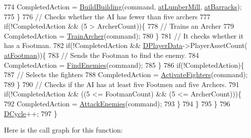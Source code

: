 \begin{DoxyCode}
774                 CompletedAction = \hyperlink{classCAIPlayer_a2ff5263cbaa6bfc62ffec4dbce87ba88}{BuildBuilding}(command, 
      \hyperlink{GameDataTypes_8h_a5600d4fc433b83300308921974477feca7bb38316bc3193b5c9ec67ea6aad549c}{atLumberMill}, \hyperlink{GameDataTypes_8h_a5600d4fc433b83300308921974477feca1cbf6c944f30d615a247eef1f57b2230}{atBarracks});
775             \}
776             \textcolor{comment}{// Checks whether the AI has fewer than five archers}
777             \textcolor{keywordflow}{if}(!CompletedAction &&  (5 > ArcherCount))\{
778                 \textcolor{comment}{// Trains an Archer}
779                 CompletedAction = \hyperlink{classCAIPlayer_af2edf1e3c54d6af693f768f86d484fd6}{TrainArcher}(command);
780             \}
781             \textcolor{comment}{// It checks whether it has a Footman.}
782             \textcolor{keywordflow}{if}(!CompletedAction && \hyperlink{classCAIPlayer_a83b5113c8f7e80df54940b647c5ee2e6}{DPlayerData}->PlayerAssetCount(
      \hyperlink{GameDataTypes_8h_a5600d4fc433b83300308921974477fecad586e8ff9ee846d22630c2066e8fb7c2}{atFootman}))\{
783                 \textcolor{comment}{// Sends the Footman to find the enemy.}
784                 CompletedAction = \hyperlink{classCAIPlayer_a33b1533570e7a00114d1b85b3551e395}{FindEnemies}(command);
785             \}
786             \textcolor{keywordflow}{if}(!CompletedAction)\{
787                 \textcolor{comment}{// Selects the fighters}
788                 CompletedAction = \hyperlink{classCAIPlayer_a4216d7e76315234a4fe22fb3a0a89c1d}{ActivateFighters}(command);
789             \}
790             \textcolor{comment}{// Checks if the AI has at least five Footmen and five Archers.}
791             \textcolor{keywordflow}{if}(!CompletedAction && ((5 <= FootmanCount) && (5 <= ArcherCount)))\{
792                 CompletedAction = \hyperlink{classCAIPlayer_adf7feeba7debf9f19b000887616d7bfb}{AttackEnemies}(command);
793             \}
794         \}
795     \}
796     \hyperlink{classCAIPlayer_adf12a7afe7ea86410b18eff47fa95253}{DCycle}++;
797 \}
\end{DoxyCode}
Here is the call graph for this function\+:
\nopagebreak
